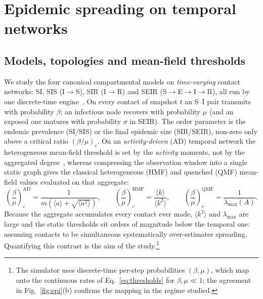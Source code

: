 \chapter{Epidemic spreading on temporal networks}


\section{Models, topologies and mean-field thresholds}

We study the four canonical compartmental models on \emph{time-varying} contact
networks: SI, SIS (I$\to$S), SIR (I$\to$R) and SEIR (S$\to$E$\to$I$\to$R), all
run by one discrete-time engine~\cite{pastorsatorras2015epidemic}. On every
contact of snapshot $t$ an S--I pair transmits with probability $\beta$; an
infectious node recovers with probability $\mu$ (and an exposed one matures
with probability $\sigma$ in SEIR). The order parameter is the endemic
prevalence (SI/SIS) or the final epidemic size (SIR/SEIR), non-zero only above
a critical ratio $(\beta/\mu)_c$. On an \emph{activity-driven} (AD) temporal
network the heterogeneous mean-field threshold is set by the \emph{activity}
moments, not by the aggregated degree~\cite{perra2012activity}, whereas
compressing the observation window into a single static graph gives the
classical heterogeneous (HMF) and quenched (QMF) mean-field values evaluated
on that aggregate:
\begin{equation}
  \left(\frac{\beta}{\mu}\right)_c^{\mathrm{AD}}
    \!= \frac{1}{m\!\left(\langle a\rangle + \sqrt{\langle a^2\rangle}\right)},
  \qquad
  \left(\frac{\beta}{\mu}\right)_c^{\mathrm{HMF}}
    \!= \frac{\langle k\rangle}{\langle k^2\rangle},
  \qquad
  \left(\frac{\beta}{\mu}\right)_c^{\mathrm{QMF}}
    \!= \frac{1}{\lambda_{\max}(A)} .
  \label{eq:thresholds}
\end{equation}
Because the aggregate accumulates every contact ever made, $\langle k^2\rangle$
and $\lambda_{\max}$ are large and the static thresholds sit orders of
magnitude below the temporal one: assuming contacts to be simultaneous
systematically over-estimates spreading. Quantifying this contrast is the aim
of the study.\footnote{The simulator uses discrete-time per-step probabilities
$(\beta,\mu)$, which map onto the continuous rates of
Eq.~\eqref{eq:thresholds} for $\beta,\mu\ll1$; the agreement in
Fig.~\ref{fig:epi}(b) confirms the mapping in the regime studied.}

